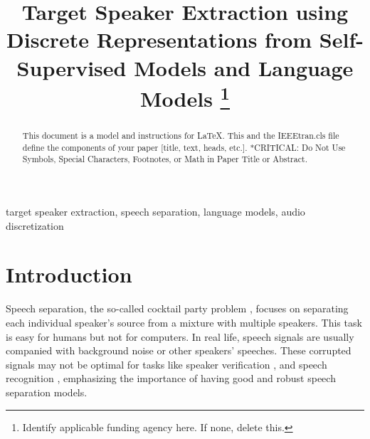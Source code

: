 \documentclass[conference]{IEEEtran}
\begin{document}
\title{Target Speaker Extraction using Discrete Representations from 
Self-Supervised Models and Language Models
\thanks{Identify applicable funding agency here. If none, delete this.}
}

\author{
\and
{}
\and
{}
\and
{}
}

\maketitle

\begin{abstract}
This document is a model and instructions for \LaTeX.
This and the IEEEtran.cls file define the components of your paper [title, text, heads, etc.]. *CRITICAL: Do Not Use Symbols, Special Characters, Footnotes, 
or Math in Paper Title or Abstract. 
\end{abstract}

\begin{IEEEkeywords}
target speaker extraction, speech separation, language models, audio discretization
\end{IEEEkeywords}

\section{Introduction}
Speech separation, the so-called cocktail party problem \cite{cocktail}, focuses on separating each individual speaker's source from a mixture with multiple speakers. This task is easy for humans but not for computers. 
In real life, speech signals are usually companied with background noise or other speakers' speeches. 
These corrupted signals may not be optimal for tasks like speaker verification \cite{rao2019targetspeakerextractionoverlapped,9414017}, and speech recognition \cite{molkov2017SpeakerAwareNN, 8462661}, emphasizing the importance of having good and robust 
speech separation models.
\end{document}
